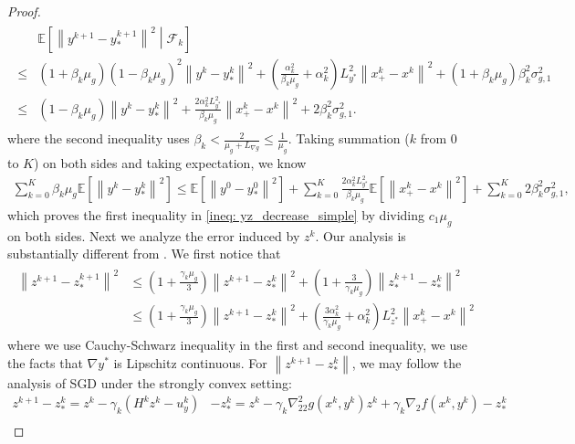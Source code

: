 \documentclass[10pt]{article}
\theoremstyle{remark}
\def\setF{\mathscr{F}} %
\newcommand{\E}{\mathbb{E}}
\newcommand{\norm}[1]{\left\|#1\right\|}
\begin{document}
\begin{proof}
\begin{align}\label{ineq: y_decrease_3_simple}
    \begin{aligned}
        &\E\left[\norm{y^{k+1} - y_*^{k+1}}^2\middle|\setF_k\right]\\
        \leq &\left(1 + \beta_k\mu_g\right)(1-\beta_k\mu_g)^2\norm{y^k - y_*^k}^2 + \left(\frac{\alpha_k^2}{\beta_k\mu_g} + \alpha_k^2\right)L_{y^*}^2\norm{x_+^k - x^k}^2 + \left(1 + \beta_k\mu_g\right)\beta_k^2\sigma_{g,1}^2 \\
        \leq & (1- \beta_k\mu_g)\norm{y^k - y_*^k}^2 + \frac{2\alpha_k^2L_{y^*}^2}{\beta_k\mu_g}\norm{x_+^k - x^k}^2 + 2\beta_k^2\sigma_{g,1}^2.
    \end{aligned}
\end{align}
where the second inequality uses $\beta_k<\frac{2}{\mu_g + L_{\nabla g}}\leq \frac{1}{\mu_g}$. Taking summation ($k$ from $0$ to $K$) on both sides and taking expectation, we know
\begin{align*}
    \sum_{k=0}^{K}\beta_k\mu_g\E\left[\norm{y^k - y_*^k}^2\right]\leq\E\left[\norm{y^0 - y_*^0}^2\right] + \sum_{k=0}^{K}\frac{2\alpha_k^2L_{y^*}^2}{\beta_k\mu_g}\E\left[\norm{x_+^k - x^k}^2\right] + \sum_{k=0}^{K}2\beta_k^2\sigma_{g,1}^2,
\end{align*}
which proves the first inequality in \eqref{ineq: yz_decrease_simple} by dividing $c_1\mu_g$ on both sides. 
Next we analyze the error induced by $z^k$. Our analysis is substantially different from \cite{dagreou2022framework}. We first notice that
\begin{align}\label{ineq: z_decrease_1_simple}
    \begin{aligned}
        \norm{z^{k+1} - z_*^{k+1}}^2 &\leq \left(1 + \frac{\gamma_k\mu_g}{3}\right)\norm{z^{k+1} - z_*^k}^2 + \left(1 + \frac{3}{\gamma_k\mu_g}\right)\norm{z_*^{k+1} - z_*^k}^2 \\
    &\leq \left(1 + \frac{\gamma_k\mu_g}{3}\right)\norm{z^{k+1} - z_*^k}^2 + \left(\frac{3\alpha_k^2}{\gamma_k\mu_g} + \alpha_k^2 \right)L_{z^*}^2\norm{x_+^k - x^k}^2 
    \end{aligned}
\end{align}
where we use Cauchy-Schwarz inequality in the first and second inequality, we use the facts that $\nabla y^*$ is Lipschitz continuous. 
For $\norm{z^{k+1} - z_*^k}$, we may follow the analysis of SGD under the strongly convex setting:
\begin{align*}
    z^{k+1} - z_*^k = z^k - \gamma_k(H^kz^k - u_{y}^k) & - z_*^k= z^k - \gamma_k\nabla_{22}^2g(x^k, y^k)z^k + \gamma_k\nabla_2 f(x^k, y^k) - z_*^k\\

\end{align*}
\end{proof}
\end{document}
